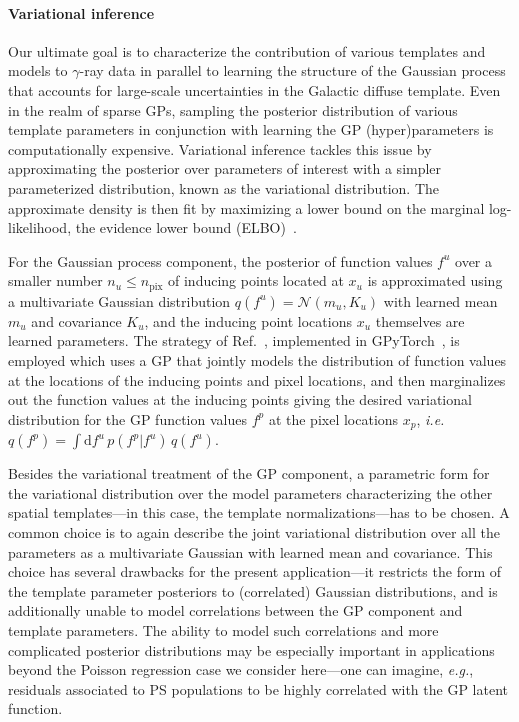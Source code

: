 \documentclass[]{article}
\begin{document}
\paragraph{Variational inference}

Our ultimate goal is to characterize the contribution of various templates and models to $\gamma$-ray data in parallel to learning the structure of the Gaussian process that accounts for large-scale uncertainties in the Galactic diffuse template. Even in the realm of sparse GPs, sampling the posterior distribution of various template parameters in conjunction with learning the GP (hyper)parameters is computationally expensive. Variational inference tackles this issue by approximating the posterior over parameters of interest with a simpler parameterized distribution, known as the variational distribution. The approximate density is then fit by maximizing a lower bound on the marginal log-likelihood, the evidence lower bound (ELBO)~\cite{wingate_automated_2013,hoffman2013stochastic}. 

For the Gaussian process component, the posterior of function values $f^u$ over a smaller number $n_u \leq n_\mathrm{pix}$ of inducing points located at $x_u$ is approximated using a multivariate Gaussian distribution $q(f^{u})=\mathcal N(m_u, K_u)$ with learned mean $m_u$ and covariance $K_u$, and the inducing point locations $x_u$ themselves are learned parameters. 
The strategy of Ref.~\cite{pmlr-v38-hensman15}, implemented in GPyTorch~\cite{gardner2018gpytorch}, is employed which uses a GP that jointly models the distribution of function values at the locations of the inducing points and pixel locations, and then marginalizes out the function values at the inducing points giving the desired variational distribution for the GP function values $f^{p}$ at the pixel locations $x_{p}$, \emph{i.e.} $q(f^{p}) = \int  \mathrm{d}f^{u}\, p(f^{p} | f^{u})\,q(f^{u})$.

Besides the variational treatment of the GP component, a parametric form for the variational distribution over the model parameters characterizing the other spatial templates---in this case, the template normalizations---has to be chosen. A common choice is to again describe the joint variational distribution over all the parameters as a multivariate Gaussian with learned mean and covariance. This choice has several drawbacks for the present application---it restricts the form of the template parameter posteriors to (correlated) Gaussian distributions, and is additionally unable to model correlations between the GP component and template parameters. The ability to model such correlations and more complicated posterior distributions may be especially important in applications beyond the Poisson regression case we consider here---one can imagine, \emph{e.g.}, residuals associated to PS populations to be highly correlated with the GP latent function.
\end{document}
